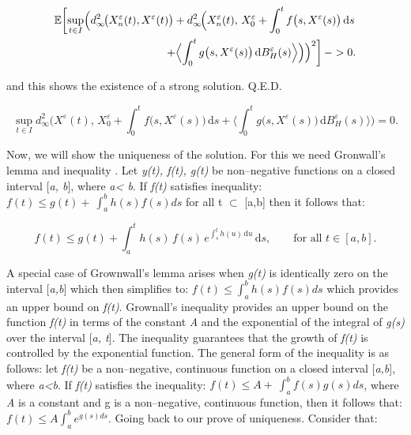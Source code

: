 \documentclass[12pt,a4paper]{report}
\numberwithin{equation}{section}
\begin{document}
\[
\begin{aligned}
\mathbb{E}\!\left[\sup_{t\in I}
\Bigl(
d_{\infty}^{2}\!\bigl(X_{n}^{\varepsilon}(t),X^{\varepsilon}(t)\bigr)
+
d_{\infty}^{2}\!\Bigl(
X_{n}^{\varepsilon}(t),\,
X_{0}^{\varepsilon}
+\int_{0}^{t} f\bigl(s,X^{\varepsilon}(s)\bigr)\,\mathrm{d}s \right.\\
\left.
+\Bigl\langle \int_{0}^{t} g\bigl(s,X^{\varepsilon}(s)\bigr)\,\mathrm{d}B_{H}^{\varepsilon}(s)\Bigr\rangle
\Bigr)
\Bigr)^{2}
\right] -> 0 .
\end{aligned}
\]



and this shows the existence of a strong solution. Q.E.D.

\begin{equation}\tag{5.1.21}\label{eq:5.1.21}
\sup_{t\in I}
d_{\infty}^{2}\!\Biggl(
X^{\varepsilon}(t),\,
X_{0}^{\varepsilon}
+\int_{0}^{t} f\bigl(s,X^{\varepsilon}(s)\bigr)\,\mathrm{d}s
+\Biggl\langle \int_{0}^{t} g\bigl(s,X^{\varepsilon}(s)\bigr)\,\mathrm{d}B_{H}^{\varepsilon}(s)\Biggr\rangle
\Biggr)
= 0 .
\end{equation}


Now, we will show the uniqueness of the solution. For this we need
Gronwall's lemma and inequality \cite{coddington1955theory_88}. Let \emph{y(t), f(t), g(t)} be
non--negative functions on a closed interval {[}\emph{a, b}{]}, where
\emph{a\textless{} b}. If \emph{f(t)} satisfies inequality:
\(f(t) \leq g(t) + \ \int_{a}^{b}{h(s)f(s)ds}\) for all t $\subset$ {[}a,b{]}
then it follows that:

\[
f(t)\le g(t)+\int_{a}^{t} h(s)\,f(s)\,e^{\int_{s}^{t}h(u)\,\mathrm{d}u}\,\mathrm{d}s,
\qquad \text{for all } t\in[a,b].
\]


A special case of Grownwall's lemma arises when \emph{g(t)} is
identically zero on the interval {[}\emph{a,b}{]} which then simplifies
to: \(f(t) \leq \int_{a}^{b}{h(s)f(s)ds}\) which provides an upper bound
on \emph{f(t)}. Grownall's inequality provides an upper bound on the
function \emph{f(t)} in terms of the constant \emph{A} and the
exponential of the integral of \emph{g(s)} over the interval {[}\emph{a,
t}{]}. The inequality guarantees that the growth of \emph{f(t)} is
controlled by the exponential function. The general form of the
inequality is as follows: let \emph{f(t)} be a non--negative, continuous
function on a closed interval {[}\emph{a,b}{]}, where
\emph{a\textless b}. If \emph{f(t)} satisfies the inequality:
\(f(t) \leq A + \ \int_{a}^{b}{f(s)g(s)ds}\), where \emph{A} is a
constant and g is a non--negative, continuous function, then it follows
that: \(f(t) \leq A\int_{a}^{b}e^{g(s)ds}\). Going back to our prove of
uniqueness. Consider that:
\end{document}
